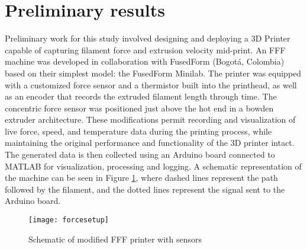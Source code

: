 \documentclass[main.tex]{subfiles}
\begin{document}
\section{Preliminary results} \label{sec:prelim}

Preliminary work for this study involved designing and deploying a 3D Printer capable of capturing filament force and extrusion velocity mid-print. An FFF machine was developed in collaboration with FusedForm (Bogot\'{a}, Colombia) based on their simplest model: the FusedForm Minilab. The printer was equipped with a customized force sensor and a thermistor built into the printhead, as well as an encoder that records the extruded filament length through time. The concentric force sensor was positioned just above the hot end in a bowden extruder architecture. These modifications permit recording and visualization of live force, speed, and temperature data during the printing process, while maintaining the original performance and functionality of the 3D printer intact. The generated data is then collected using an Arduino board connected to MATLAB for visualization, processing and logging. A schematic representation of the machine can be seen in Figure \ref{fig:shakira}, where dashed lines represent the path followed by the filament, and the dotted lines represent the signal sent to the Arduino board.

\begin{figure}[!htbp]
	\center
	\texttt{[image: forcesetup]}
	\caption{Schematic of modified FFF printer with sensors} \label{fig:shakira}
\end{figure}
\end{document}
